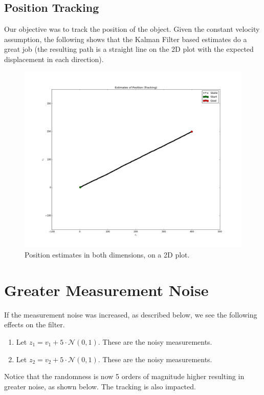 \documentclass{article}
\begin{document}
\subsection{Position Tracking}
Our objective was to track the position of the object. Given the constant velocity assumption, the following shows that the Kalman Filter based estimates do a great job (the resulting path is a straight line on the 2D plot with the expected displacement in each direction).

\begin{figure}[H]
  \includegraphics[width=\linewidth]{position_tracking.png}
  \caption{Position estimates in both dimensions, on a 2D plot.}
  \label{fig:m4}
\end{figure}


\section{Greater Measurement Noise}
If the measurement noise was increased, as described below, we see the following effects on the filter.

\begin{enumerate}
    \item Let $z_1 = v_1 + 5 \cdot \mathcal {N}(0,1)$. These are the noisy measurements.
    \item Let $z_2 = v_2 + 5 \cdot \mathcal {N}(0,1)$. These are the noisy measurements.
\end{enumerate}

Notice that the randomness is now 5 orders of magnitude higher resulting in greater noise, as shown below. The tracking is also impacted.
\end{document}
